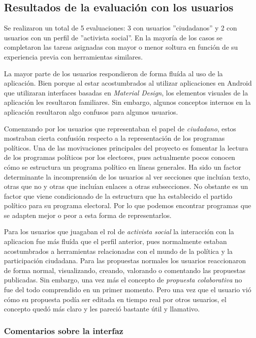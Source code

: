 \subsection{Resultados de la evaluación con los usuarios}

Se realizaron un total de 5 evaluaciones: 3 con usuarios ''ciudadanos'' y 2 con usuarios con un perfil de ''activista social''. En la mayoría de los casos se completaron las tareas asignadas con mayor o menor soltura en función de su experiencia previa con herramientas similares.

La mayor parte de los usuarios respondieron de forma fluída al uso de la aplicación. Bien porque al estar acostumbrados al utilizar aplicaciones en Android que utilizaran interfaces basadas en \textit{Material Design}, los elementos visuales de la aplicación les resultaron familiares. Sin embargo, algunos conceptos internos en la aplicación resultaron algo confusos para algunos usuarios.

Comenzando por los usuarios que representaban el papel de \textit{ciudadano}, estos mostraban cierta confusión respecto a la representación de los programas políticos. Una de las movivaciones principales del proyecto es fomentar la lectura de los programas políticos por los electores, pues actualmente pocos conocen cómo se estructura un programa político en líneas generales. Ha sido un factor determinante la incomprensión de los usuarios al ver secciones que incluían texto, otras que no y otras que incluían enlaces a otras subsecciones. No obstante es un factor que viene condicionado de la estructura que ha establecido el partido político para su programa electoral. Por lo que podemos encontrar programas que se adapten mejor o peor a esta forma de representarlos.

Para los usuarios que juagaban el rol de \textit{activista social} la interacción con la aplicacion fue más fluída que el perfil anterior, pues normalmente estaban acostumbrados a herramientas relacionadas con el mundo de la política y la participación ciudadana. Para las propuestas normales los usuarios reaccionaron de forma normal, visualizando, creando, valorando o comentando las propuestas publicadas. Sin embargo, una vez más el concepto de \textit{propuesta colaborativa} no fue del todo comprendido en un primer momento. Pero una vez que el usuario vió cómo su propuesta podía ser editada en tiempo real por otros usuarios, el concepto quedó más claro y les pareció bastante útil y llamativo.

\subsubsection{Comentarios sobre la interfaz}

